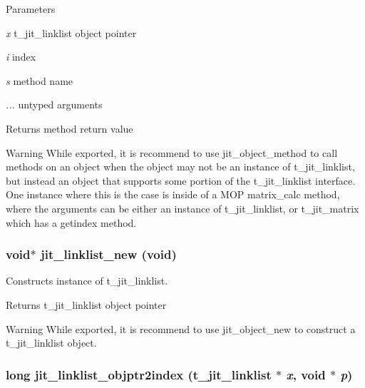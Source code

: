 \begin{DoxyParams}{Parameters}
\item[{\em x}]t\_\-jit\_\-linklist object pointer \item[{\em i}]index \item[{\em s}]method name \item[{\em ...}]untyped arguments\end{DoxyParams}
\begin{DoxyReturn}{Returns}
method return value
\end{DoxyReturn}
\begin{DoxyWarning}{Warning}
While exported, it is recommend to use jit\_\-object\_\-method to call methods on an object when the object may not be an instance of t\_\-jit\_\-linklist, but instead an object that supports some portion of the t\_\-jit\_\-linklist interface. One instance where this is the case is inside of a MOP matrix\_\-calc method, where the arguments can be either an instance of t\_\-jit\_\-linklist, or t\_\-jit\_\-matrix which has a getindex method. 
\end{DoxyWarning}
\hypertarget{group__linklistmod_gae31b06dd709cdaf1e035ad562bd5626f}{
\subsubsection[{jit\_\-linklist\_\-new}]{\setlength{\rightskip}{0pt plus 5cm}void$\ast$ jit\_\-linklist\_\-new (void)}}
\label{group__linklistmod_gae31b06dd709cdaf1e035ad562bd5626f}


Constructs instance of t\_\-jit\_\-linklist. \begin{DoxyReturn}{Returns}
t\_\-jit\_\-linklist object pointer
\end{DoxyReturn}
\begin{DoxyWarning}{Warning}
While exported, it is recommend to use jit\_\-object\_\-new to construct a t\_\-jit\_\-linklist object. 
\end{DoxyWarning}
\hypertarget{group__linklistmod_ga2861d793a9f33c725e5d49946bb7e6bc}{
\subsubsection[{jit\_\-linklist\_\-objptr2index}]{\setlength{\rightskip}{0pt plus 5cm}long jit\_\-linklist\_\-objptr2index (t\_\-jit\_\-linklist $\ast$ {\em x}, \/  void $\ast$ {\em p})}}
\label{group__linklistmod_ga2861d793a9f33c725e5d49946bb7e6bc}


